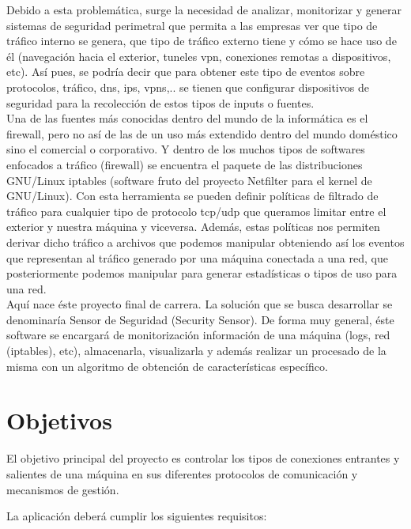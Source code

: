 Debido a esta problemática, surge la necesidad de analizar, monitorizar y generar sistemas de seguridad perimetral que permita a las empresas ver que tipo de tráfico interno se genera, que tipo de tráfico externo tiene y cómo se hace uso de él (navegación hacia el exterior, tuneles vpn, conexiones remotas a dispositivos, etc). Así pues, se podría decir que para obtener este tipo de eventos sobre protocolos, tráfico, dns, ips, vpns,.. se tienen que configurar dispositivos de seguridad para la recolección de estos tipos de inputs o fuentes. \\

Una de las fuentes más conocidas dentro del mundo de la informática es el firewall, pero no así de las de un uso más extendido dentro del mundo doméstico sino el comercial o corporativo. Y dentro de los muchos tipos de softwares enfocados a tráfico (firewall) se encuentra el paquete de las distribuciones GNU/Linux iptables (software fruto del proyecto Netfilter para el kernel de GNU/Linux). Con esta herramienta se pueden definir políticas de filtrado de tráfico para cualquier tipo de protocolo tcp/udp que queramos limitar entre el exterior y nuestra máquina y viceversa. Además, estas políticas nos permiten derivar dicho tráfico a archivos que podemos manipular obteniendo así los eventos que representan al tráfico generado por una máquina conectada a una red, que posteriormente podemos manipular para generar estadísticas o tipos de uso para una red. \\

Aquí nace éste proyecto final de carrera. La solución que se busca desarrollar se denominaría Sensor de Seguridad (Security Sensor). De forma muy general, éste software se encargará de monitorización información de una máquina (logs, red (iptables), etc), almacenarla, visualizarla y además realizar un procesado de la misma con un algoritmo de obtención de características específico. \\

\section{Objetivos}

El objetivo principal del proyecto es controlar los tipos de conexiones entrantes y salientes de una máquina en sus diferentes protocolos de comunicación y mecanismos de gestión.

La aplicación deberá cumplir los siguientes requisitos:

